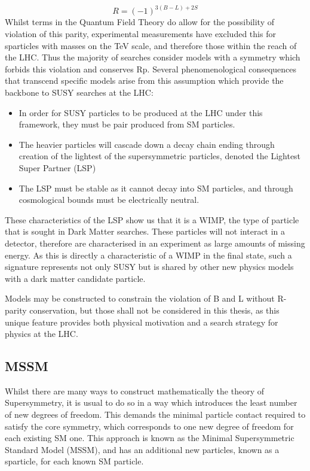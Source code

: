 \begin{equation}
R = (-1)^{3(B-L)+2S}
\label{eqn:RPAR}
\end{equation}
Whilst terms in the Quantum Field Theory do allow for the possibility of violation of this parity, experimental measurements have excluded this for sparticles with masses on the TeV scale, and therefore those within the reach of the LHC. Thus the  majority of searches consider models with a symmetry which forbids this violation and conserves Rp. Several phenomenological consequences that transcend specific models arise from this assumption which provide the backbone to SUSY searches at the LHC:

\begin{itemize}
\item{In order for SUSY particles to be produced at the LHC under this framework, they must be pair produced from SM particles.} 

\item{The heavier particles will cascade down a decay chain ending through creation of the lightest of the supersymmetric particles, denoted the Lightest Super Partner (LSP)}

\item{The LSP must be stable as it cannot decay into SM particles, and through cosmological bounds must be electrically neutral.} 
\end{itemize}
These characteristics of the LSP show us that it is a WIMP, the type of particle that is sought in Dark Matter searches.  These particles will not interact in a detector, therefore are characterised in an experiment as large amounts of missing energy. As this is directly a characteristic of a WIMP in the final state, such a signature represents not only SUSY but is shared by other new physics models with a dark matter candidate particle. 

Models may be constructed to constrain the violation of B and L without R-parity conservation, but those shall not be considered in this thesis, as this unique feature provides both physical motivation and a search strategy for physics at the LHC.


\subsection{MSSM} 

Whilst there are many ways to construct mathematically the theory of Supersymmetry, it is usual to do so in a way which introduces the least number of new degrees of freedom. This demands the minimal particle contact required to satisfy the core symmetry, which corresponds to one new degree of freedom for each existing SM one. This approach is known as the Minimal Supersymmetric Standard Model (MSSM), and has an additional new particles, known as a sparticle, for each known SM particle. 

